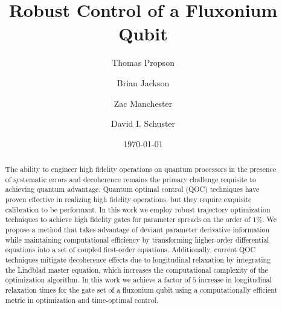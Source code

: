 \documentclass[
  amsfonts,
  amsmath,
  tbtags,
  amssymb,
  aps,
  nobibnotes,
  twocolumn,
  superscriptaddress,
]{revtex4-2}
\begin{document}
\title{Robust Control of a Fluxonium Qubit}

\author{Thomas Propson}
\author{Brian Jackson}
\author{Zac Manchester}
\author{David I. Schuster}

\date{\today}


\begin{abstract}
  The ability to engineer high fidelity operations on quantum processors in the presence of
  systematic errors and decoherence remains the primary challenge requisite to achieving quantum advantage.
  Quantum optimal control (QOC) techniques have proven effective in realizing high fidelity operations,
  but they require exquisite calibration to be performant.
  In this work we employ robust trajectory optimization techniques
  to achieve high fidelity gates for parameter spreads on the order of $1\%$. We propose a method that
  takes advantage of deviant parameter derivative information while maintaining
  computational efficiency by transforming
  higher-order differential equations into a set of coupled first-order equations.
  Additionally, current QOC techniques mitigate decoherence effects due to longitudinal relaxation by integrating
  the Lindblad master equation, which increases the computational complexity
  of the optimization algorithm.
  In this work we achieve a factor of $5$ increase in longitudinal relaxation times
  for the gate set of a fluxonium qubit
  using a computationally efficient metric in optimization and time-optimal control.
\end{abstract}

\maketitle


\end{document}
